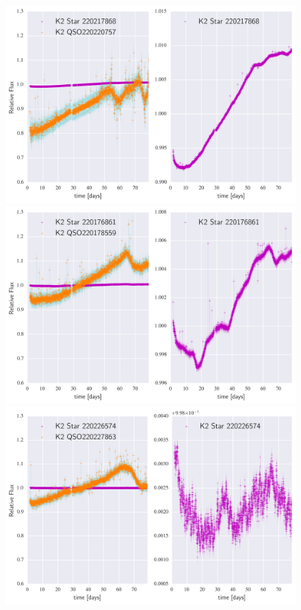 \documentclass[a4paper,fleqn,usenatbib]{mnras}
\begin{document}
          \begin{figure}
  	\includegraphics[width=\columnwidth]{220220757NearestNeighbor.png}
  	\includegraphics[width=\columnwidth]{220178559NearestNeighbor.png}
  	\includegraphics[width=\columnwidth]{220227863NearestNeighbor.png}
          	\caption{}
          	\label{fig:example_figure}
          \end{figure}
\end{document}

